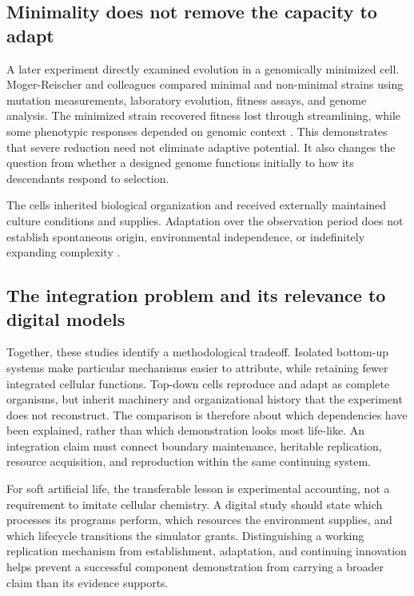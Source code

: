 \subsection{Minimality does not remove the capacity to adapt}

A later experiment directly examined evolution in a genomically minimized
cell. Moger-Reischer and colleagues compared minimal and non-minimal strains
using mutation measurements, laboratory evolution, fitness assays, and genome
analysis. The minimized strain recovered fitness lost through streamlining,
while some phenotypic responses depended on genomic context
\citep{wetMogerReischer2023}. This demonstrates that severe reduction need not
eliminate adaptive potential. It also changes the question from whether a
designed genome functions initially to how its descendants respond to selection.

The cells inherited biological organization and received externally maintained
culture conditions and supplies. Adaptation over the observation period does
not establish spontaneous origin, environmental independence, or indefinitely
expanding complexity \citep{wetMogerReischer2023}.

\subsection{The integration problem and its relevance to digital models}

Together, these studies identify a methodological tradeoff. Isolated bottom-up
systems make particular mechanisms easier to attribute, while retaining fewer
integrated cellular functions. Top-down cells reproduce and adapt as complete
organisms, but inherit machinery and organizational history that the experiment
does not reconstruct. The comparison is therefore about which dependencies
have been explained, rather than which demonstration looks most life-like.
An integration claim must connect boundary maintenance, heritable replication,
resource acquisition, and reproduction within the same continuing system.

For soft artificial life, the transferable lesson is experimental accounting,
not a requirement to imitate cellular chemistry. A digital study should state
which processes its programs perform, which resources the environment supplies,
and which lifecycle transitions the simulator grants. Distinguishing a working
replication mechanism from establishment, adaptation, and continuing innovation
helps prevent a successful component demonstration from carrying a broader
claim than its evidence supports.
